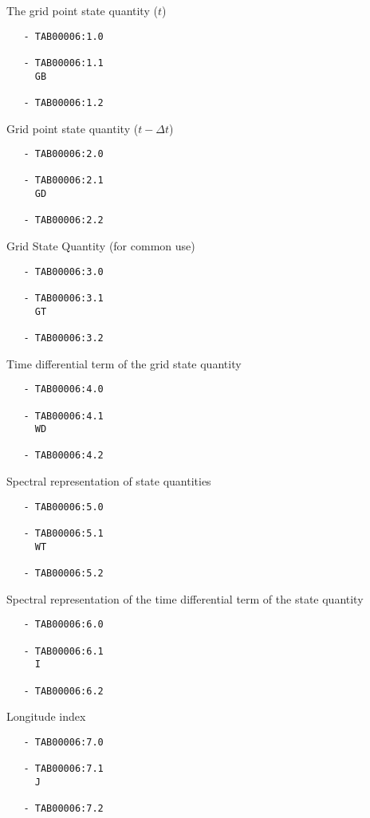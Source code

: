The grid point state quantity (\(t\))

\begin{verbatim}
   - TAB00006:1.0
 
   - TAB00006:1.1 
     GB
 
   - TAB00006:1.2 
\end{verbatim}

Grid point state quantity (\(t-\Delta t\))

\begin{verbatim}
   - TAB00006:2.0
 
   - TAB00006:2.1 
     GD
 
   - TAB00006:2.2 
\end{verbatim}

Grid State Quantity (for common use)

\begin{verbatim}
   - TAB00006:3.0
 
   - TAB00006:3.1 
     GT
 
   - TAB00006:3.2 
\end{verbatim}

Time differential term of the grid state quantity

\begin{verbatim}
   - TAB00006:4.0
 
   - TAB00006:4.1 
     WD
 
   - TAB00006:4.2 
\end{verbatim}

Spectral representation of state quantities

\begin{verbatim}
   - TAB00006:5.0
 
   - TAB00006:5.1 
     WT
 
   - TAB00006:5.2 
\end{verbatim}

Spectral representation of the time differential term of the state
quantity

\begin{verbatim}
   - TAB00006:6.0
 
   - TAB00006:6.1 
     I
 
   - TAB00006:6.2 
\end{verbatim}

Longitude index

\begin{verbatim}
   - TAB00006:7.0
 
   - TAB00006:7.1 
     J
 
   - TAB00006:7.2 
\end{verbatim}

